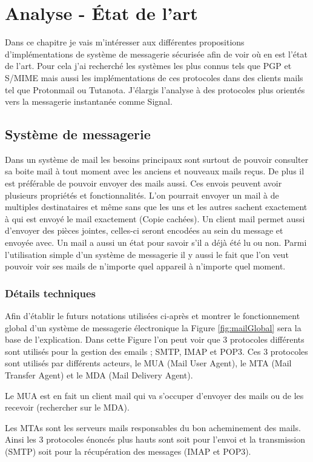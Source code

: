 \chapter{Analyse - État de l'art}
\label{ch:analysis}
Dans ce chapitre je vais m'intéresser aux différentes propositions d'implémentations de système de messagerie sécurisée afin de voir où en est l'état de l'art. Pour cela j'ai recherché les systèmes les plus connus tels que PGP et S/MIME mais aussi les implémentations de ces protocoles dans des clients mails tel que Protonmail ou Tutanota. J'élargis l'analyse à des protocoles plus orientés vers la messagerie instantanée comme Signal.
\section{Système de messagerie}
Dans un système de mail les besoins principaux sont surtout de pouvoir consulter sa boite mail à tout moment avec les anciens et nouveaux mails reçus. De plus il est préférable de pouvoir envoyer des mails aussi. Ces envois peuvent avoir plusieurs propriétés et fonctionnalités. L'on pourrait envoyer un mail à de multiples destinataires et même sans que les uns et les autres sachent exactement à qui est envoyé le mail exactement (Copie cachées). Un client mail permet aussi d'envoyer des pièces jointes, celles-ci seront encodées au sein du message et envoyée avec. Un mail a aussi un état pour savoir s'il a déjà été lu ou non. Parmi l'utilisation simple d'un système de messagerie il y aussi le fait que l'on veut pouvoir voir ses mails de n'importe quel appareil à n'importe quel moment. 
\subsection{Détails techniques}
Afin d'établir le futurs notations utilisées ci-après et montrer le fonctionnement global d'un système de messagerie électronique la Figure \ref{fig:mailGlobal} sera la base de l'explication. Dans cette Figure l'on peut voir que 3 protocoles différents sont utilisés pour la gestion des emails ; SMTP, IMAP et POP3. Ces 3 protocoles sont utilisés par différents acteurs, le MUA (Mail User Agent), le MTA (Mail Transfer Agent) et le MDA (Mail Delivery Agent).

Le MUA est en fait un client mail qui va s'occuper d'envoyer des mails ou de les recevoir (rechercher sur le MDA). 
 
 Les MTAs sont les serveurs mails responsables du bon acheminement des mails. Ainsi les 3 protocoles énoncés plus hauts sont soit pour l'envoi et la transmission (SMTP) soit pour la récupération des messages (IMAP et POP3). 
 

